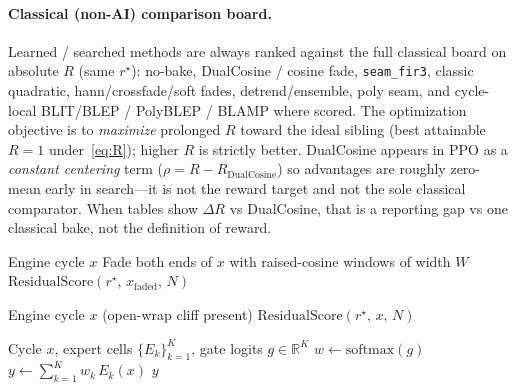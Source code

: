 \paragraph{Classical (non-AI) comparison board.}
\label{sec:classical-board}
Learned / searched methods are always ranked against the full classical board on absolute $R$ (same $r^{\star}$):
no-bake, DualCosine / cosine fade, \texttt{seam\_fir3}, classic quadratic, hann/crossfade/soft fades, detrend/ensemble, poly seam, and cycle-local BLIT/BLEP / PolyBLEP / BLAMP where scored.
The optimization objective is to \emph{maximize} prolonged $R$ toward the ideal sibling (best attainable $R{=}1$ under~\eqref{eq:R}); higher $R$ is strictly better.
DualCosine appears in PPO as a \emph{constant centering} term ($\rho{=}R-R_{\mathrm{DualCosine}}$) so advantages are roughly zero-mean early in search---it is not the reward target and not the sole classical comparator.
When tables show $\Delta R$ vs DualCosine, that is a reporting gap vs one classical bake, not the definition of reward.

\begin{algorithm}[t]
\caption{DualCosine baseline}
\label{alg:dualcosine}
\begin{algorithmic}[1]
\Require Engine cycle $x$
\State Fade both ends of $x$ with raised-cosine windows of width $W$
\State \Return $\mathrm{ResidualScore}(r^{\star},\,x_{\mathrm{faded}},\,N)$
\end{algorithmic}
\end{algorithm}

\begin{algorithm}[t]
\caption{No-bake (passthrough) control}
\label{alg:no-bake}
\begin{algorithmic}[1]
\Require Engine cycle $x$ (open-wrap cliff present)
\State \Return $\mathrm{ResidualScore}(r^{\star},\,x,\,N)$ 
\end{algorithmic}
\end{algorithm}

\begin{algorithm}[t]
\caption{MoE soft gating over bake experts}
\label{alg:moe}
\begin{algorithmic}[1]
\Require Cycle $x$, expert cells $\{E_k\}_{k=1}^{K}$, gate logits $g\in\mathbb{R}^{K}$
\State $w \gets \mathrm{softmax}(g)$
\State $y \gets \sum_{k=1}^{K} w_k\, E_k(x)$
\State \Return $y$
\end{algorithmic}
\end{algorithm}

